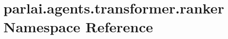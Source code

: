 \hypertarget{namespaceparlai_1_1agents_1_1transformer_1_1ranker}{}\section{parlai.\+agents.\+transformer.\+ranker Namespace Reference}
\label{namespaceparlai_1_1agents_1_1transformer_1_1ranker}
